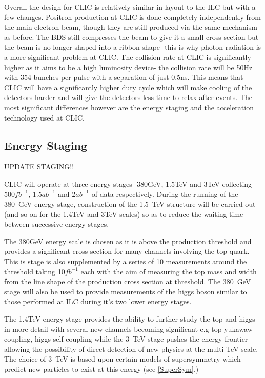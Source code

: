 Overall the design for \ac{CLIC} is relatively similar in layout to the \ac{ILC} but with a few changes. Positron production at \ac{CLIC} is done completely independently from the main electron beam, though they are still produced via the same mechanism as before. The \ac{BDS} still compresses the beam to give it a small cross-section but the beam is no longer shaped into a ribbon shape- this is why photon radiation is a more significant problem at \ac{CLIC}. The collision rate at \ac{CLIC} is significantly higher as it aims to be a high luminosity device- the collision rate will be 50Hz with 354 bunches per pulse with a separation of just 0.5ns. This means that CLIC will have a significantly higher duty cycle which will make cooling of the detectors harder and will give the detectors less time to relax after events. The most significant differences however are the energy staging and the acceleration technology used at \ac{CLIC}.

\subsection{Energy Staging}
UPDATE STAGING!!

CLIC will operate at three energy stages- 380GeV, 1.5TeV and 3TeV collecting 500${fb^{-1}}$, 1.5${ab^{-1}}$ and 2${ab^{-1}}$ of data respectively. During the running of the 380~GeV energy stage, construction of the 1.5~TeV structure will be carried out (and so on for the 1.4TeV and 3TeV scales) so as to reduce the waiting time between successive energy stages. 

The 380GeV energy scale is chosen as it is above the \ttbar production threshold and provides a significant cross section for many channels involving the top quark. This is stage is also supplemented by a series of 10 measurements around the \ttbar threshold taking 10${fb^{-1}}$ each with the aim of measuring the top mass and width from the line shape of the \ttbar production cross section at threshold. The 380~GeV stage will also be used to provide measurements of the higgs boson similar to those performed at \ac{ILC} during it's two lower energy stages.

The 1.4TeV energy stage provides the ability to further study the top and higgs in more detail with several new channels becoming significant e.g top yukawaw coupling, higgs self coupling while the 3~TeV stage pushes the energy frontier allowing the possibility of direct detection of new physics at the multi-TeV scale. The choice of 3~TeV is based upon certain models of supersymmetry which predict new particles to exist at this energy (see \ref{SuperSym}.)


